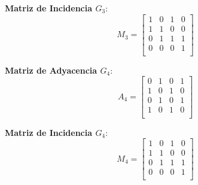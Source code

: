 \documentclass{article}
\begin{document}
\textbf{Matriz de Incidencia \( G_3 \)}:
\[
	M_3 =
	\begin{bmatrix}
		1 & 0 & 1 & 0 \\
		1 & 1 & 0 & 0 \\
		0 & 1 & 1 & 1 \\
		0 & 0 & 0 & 1 \\
	\end{bmatrix}
\]

\textbf{Matriz de Adyacencia \( G_4 \)}:
\[
	A_4 =
	\begin{bmatrix}
		0 & 1 & 0 & 1 \\
		1 & 0 & 1 & 0 \\
		0 & 1 & 0 & 1 \\
		1 & 0 & 1 & 0 \\
	\end{bmatrix}
\]

\textbf{Matriz de Incidencia \( G_4 \)}:
\[
	M_4 =
	\begin{bmatrix}
		1 & 0 & 1 & 0 \\
		1 & 1 & 0 & 0 \\
		0 & 1 & 1 & 1 \\
		0 & 0 & 0 & 1 \\
	\end{bmatrix}
\]
\end{document}
